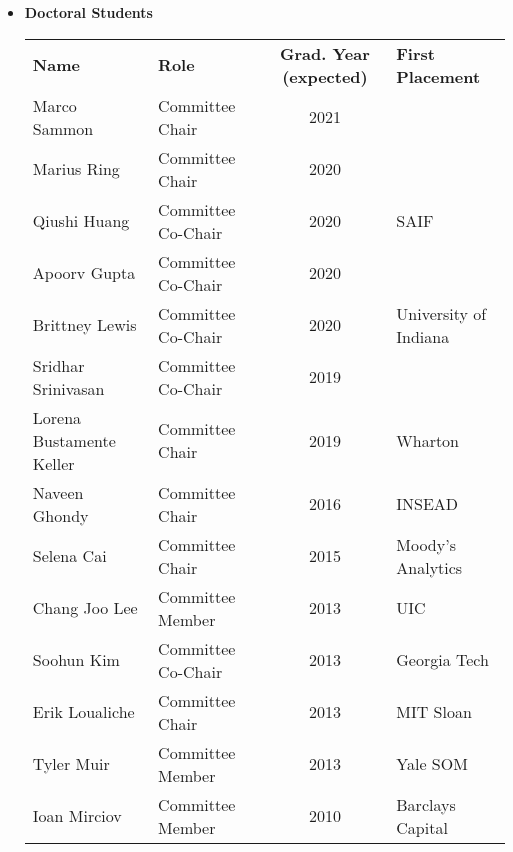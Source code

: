 \documentclass[11pt,letterpaper,serif,overlapped]{res}
\begin{document}
\begin{resume}
\begin{itemize}
\begin{longtable}{lp{11.5cm}}
 \end{longtable}

\vspace{0.5cm}

\item \textbf{Doctoral Students}\\
\begin{longtable}{llcl}
\textbf{Name} & \textbf{Role} & \textbf{Grad. Year (expected) }& \textbf{First Placement}\\
Marco Sammon  & Committee Chair& 2021\\
Marius Ring &   Committee Chair & 2020 & \\
Qiushi Huang & Committee Co-Chair & 2020 & SAIF\\
Apoorv Gupta  & Committee Co-Chair & 2020 & \\
Brittney Lewis  &Committee Co-Chair & 2020 & University of Indiana  \\
Sridhar  Srinivasan  &Committee Co-Chair  & 2019\\
Lorena Bustamente Keller & Committee Chair & 2019& Wharton \\
Naveen Ghondy  &  Committee Chair &2016 & INSEAD \\
Selena Cai  &  Committee Chair &2015 & Moody's Analytics\\
Chang Joo Lee   &  Committee Member &2013 & UIC \\
Soohun Kim   &  Committee  Co-Chair  &2013 & Georgia Tech \\
Erik Loualiche & Committee  Chair&2013    & MIT Sloan \\
Tyler Muir&   Committee Member  &2013& Yale  SOM\\
Ioan Mirciov  & Committee Member&2010 & Barclays Capital\\


\end{longtable}



\end{itemize}





\end{resume}
\end{document}
